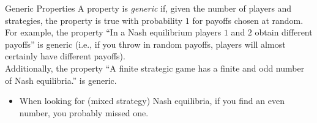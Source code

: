 \documentclass[10pt]{extarticle}
\begin{document}
  \begin{problem}{Generic Properties}
    A property is \textit{generic} if, given the number of players and strategies, the property is true with probability $1$ for payoffs chosen at random.\\

    For example, the property ``In a Nash equilibrium players $1$ and $2$ obtain different payoffs'' is generic (i.e., if you throw in random payoffs, players will almost certainly have different payoffs).\\

    Additionally, the property ``A finite strategic game has a finite and odd number of Nash equilibria.'' is generic.
    \begin{itemize}
      \item When looking for (mixed strategy) Nash equilibria, if you find an even number, you probably missed one.
    \end{itemize}
  \end{problem}
\end{document}
